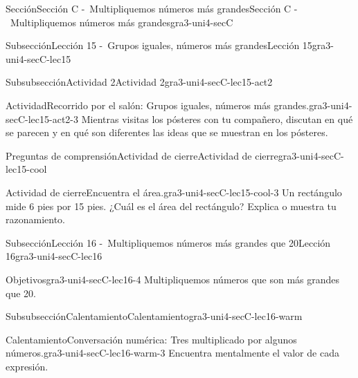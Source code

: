 \documentclass[twoside,10pt,]{article}
\begin{document}
\begin{sectionptx}{Sección}{Sección C -~Multipliquemos números más grandes}{}{Sección C -~Multipliquemos números más grandes}{}{}{gra3-uni4-secC}
\begin{subsectionptx}{Subsección}{Lección 15 -~Grupos iguales, números más grandes}{}{Lección 15}{}{}{gra3-uni4-secC-lec15}
\typeout{************************************************}
%
\begin{subsubsectionptx}{Subsubsección}{Actividad 2}{}{Actividad 2}{}{}{gra3-uni4-secC-lec15-act2}
\begin{activity}{Actividad}{Recorrido por el salón: Grupos iguales, números más grandes.}{gra3-uni4-secC-lec15-act2-3}%
Mientras visitas los pósteres con tu compañero, discutan en qué se parecen y en qué son diferentes las ideas que se muestran en los pósteres.%
\end{activity}%
\end{subsubsectionptx}
%
%
\typeout{************************************************}
\typeout{************************************************}
%
\begin{reading-questions-subsubsection}{Preguntas de comprensión}{Actividad de cierre}{}{Actividad de cierre}{}{}{gra3-uni4-secC-lec15-cool}
\begin{project}{Actividad de cierre}{Encuentra el área.}{gra3-uni4-secC-lec15-cool-3}%
Un rectángulo mide 6 pies por 15 pies. ¿Cuál es el área del rectángulo? Explica o muestra tu razonamiento.%
\end{project}%
\end{reading-questions-subsubsection}
\end{subsectionptx}
%
%
\typeout{************************************************}
\typeout{************************************************}
%
\begin{subsectionptx}{Subsección}{Lección 16 -~Multipliquemos números más grandes que 20}{}{Lección 16}{}{}{gra3-uni4-secC-lec16}
\begin{objectives}{Objetivos}{gra3-uni4-secC-lec16-4}
Multipliquemos números que son más grandes que 20.%
\end{objectives}
%
%
\typeout{************************************************}
\typeout{************************************************}
%
\begin{subsubsectionptx}{Subsubsección}{Calentamiento}{}{Calentamiento}{}{}{gra3-uni4-secC-lec16-warm}
\begin{exploration}{Calentamiento}{Conversación numérica: Tres multiplicado por algunos números.}{gra3-uni4-secC-lec16-warm-3}%
Encuentra mentalmente el valor de cada expresión.%
%
\begin{itemize}[label=\textbullet]

\end{itemize}
\end{exploration}
\end{subsubsectionptx}
\end{subsectionptx}
\end{sectionptx}
\end{document}
